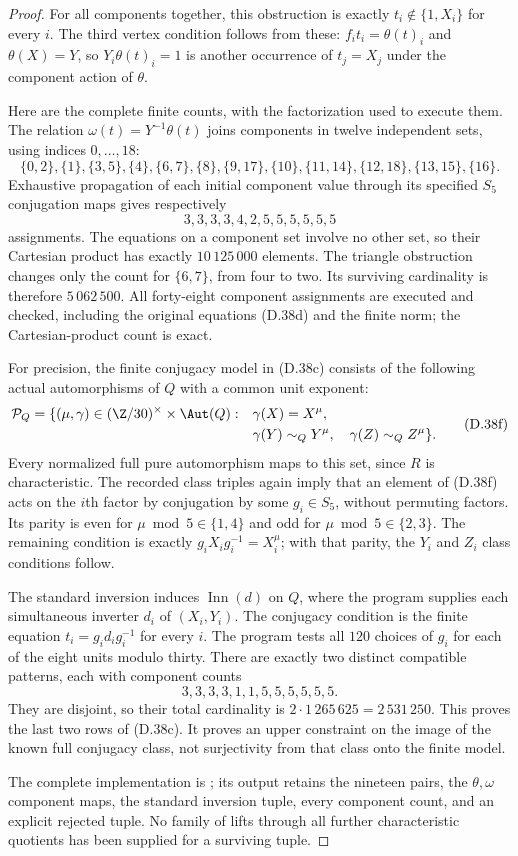 \begin{proof}
For all components together, this obstruction
is exactly
$t_i\notin\{1,X_i\}$ for every $i$.
The third vertex condition follows from these:
$f_i t_i=\theta(t)_i$ and $\theta(X)=Y$,
so $Y_i\theta(t)_i=1$ is another occurrence
of $t_j=X_j$ under the component action of
$\theta$.

Here are the complete finite counts, with the
factorization used to execute them.
The relation $\omega(t)=Y^{-1}\theta(t)$
joins components in twelve independent
sets, using indices $0,\ldots,18$:
\[
 \{0,2\},\{1\},\{3,5\},\{4\},\{6,7\},\{8\},
 \{9,17\},\{10\},\{11,14\},\{12,18\},\{13,15\},\{16\}.
\]
Exhaustive propagation of each initial component
value through its specified $S_5$ conjugation
maps gives respectively
\[
                 3,3,3,3,4,2,5,5,5,5,5,5
\]
assignments.  The equations on a component set
involve no other set, so their Cartesian product
has exactly $10\,125\,000$ elements.
The triangle obstruction changes only the
count for $\{6,7\}$, from four to two.
Its surviving cardinality is therefore
$5\,062\,500$.
All forty-eight component assignments are
executed and checked, including the original
equations (D.38d) and the finite norm; the
Cartesian-product count is exact.

For precision, the finite conjugacy model in
(D.38c) consists of the following actual
automorphisms of $Q$ with a common unit exponent:
\[
\begin{split}
 \mathcal P_Q=\{(\mu,\gamma)\in
      (\Z/30)^\times\times\Aut(Q):\quad&
 \gamma(X)=X^\mu,\\
 &\gamma(Y)\sim_QY^\mu,\quad
 \gamma(Z)\sim_QZ^\mu\}.
\end{split}                                                     \tag{D.38f}
\]
Every normalized full pure automorphism
maps to this set, since $R$ is characteristic.
The recorded class triples again imply that
an element of (D.38f) acts on the $i$th
factor by conjugation by some $g_i\in S_5$,
without permuting factors.
Its parity is even for $\mu\bmod5\in\{1,4\}$
and odd for $\mu\bmod5\in\{2,3\}$.
The remaining condition is exactly
$g_iX_i g_i^{-1}=X_i^\mu$; with that parity,
the $Y_i$ and $Z_i$ class conditions follow.

The standard inversion induces
$\operatorname{Inn}(d)$ on $Q$, where the
program supplies each simultaneous inverter
$d_i$ of $(X_i,Y_i)$.
The conjugacy condition is the finite equation
$t_i=g_i d_i g_i^{-1}$ for every $i$.
The program tests all $120$ choices of $g_i$
for each of the eight units modulo thirty.
There are exactly two distinct compatible
patterns, each with component counts
\[
                  3,3,3,3,1,1,5,5,5,5,5,5.
\]
They are disjoint, so their total cardinality
is $2\cdot1\,265\,625=2\,531\,250$.
This proves the last two rows of (D.38c).
It proves an upper constraint on the image
of the known full conjugacy class, not
surjectivity from that class onto the
finite model.

The complete implementation is
;
its output retains the nineteen pairs,
the $\theta,\omega$ component maps, the
standard inversion tuple, every component
count, and an explicit rejected tuple.
No family of lifts through all further
characteristic quotients has been supplied
for a surviving tuple.
\end{proof}
